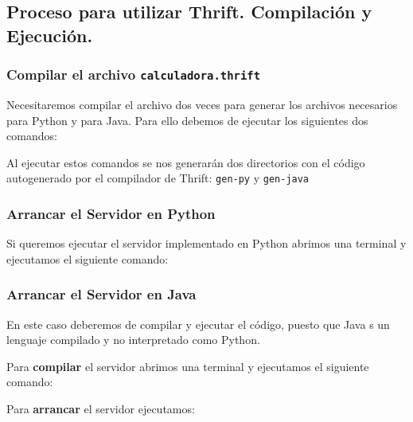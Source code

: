 \documentclass[a4paper,12pt]{article}
\begin{document}
		\subsection{Proceso para utilizar Thrift. Compilación y Ejecución.}
		
			\subsubsection{Compilar el archivo \texttt{calculadora.thrift}}
				Necesitaremos compilar el archivo dos veces para generar los archivos necesarios para Python y para Java. Para ello debemos de ejecutar los siguientes dos comandos:
				\begin{center}
				\end{center}
				\begin{center}
				\end{center}
				
				Al ejecutar estos comandos se nos generarán dos directorios con el código autogenerado por el compilador de Thrift: \texttt{gen-py} y \texttt{gen-java}
				
		
			\subsubsection{Arrancar el Servidor en Python}
				Si queremos ejecutar el servidor implementado en Python abrimos una terminal y ejecutamos el siguiente comando:
					\begin{center}
					\end{center}
					
			\subsubsection{Arrancar el Servidor en Java}
				En este caso deberemos de compilar y ejecutar el código, puesto que Java s un lenguaje compilado y no interpretado como Python.
				
				Para \textbf{compilar} el servidor  abrimos una terminal y ejecutamos el siguiente comando:
				\begin{center}
				\end{center}
				
				Para \textbf{arrancar} el servidor ejecutamos:
				\begin{center}
				\end{center}
				
\end{document}
